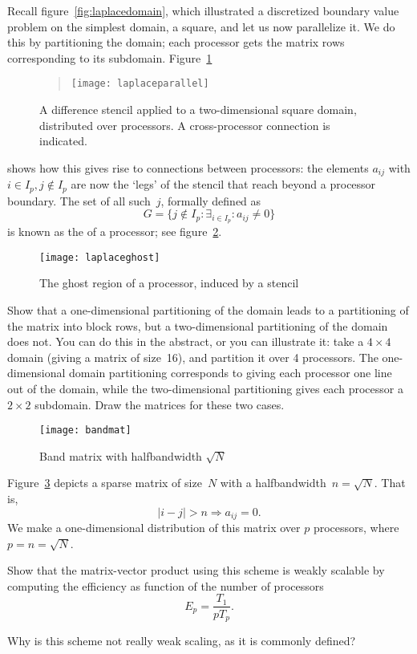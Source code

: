 Recall figure~\ref{fig:laplacedomain}, which illustrated a discretized
boundary value problem on the simplest domain, a square, and let us
now parallelize it. We do this by partitioning the domain; each
processor gets the matrix rows corresponding to its subdomain.
Figure~\ref{fig:laplaceparallel}
\begin{figure}
  \begin{quote}
    \texttt{[image: laplaceparallel]}
  \end{quote}
  \caption{A difference stencil applied to a two-dimensional square
    domain, distributed over processors. A cross-processor connection
    is indicated.}
  \label{fig:laplaceparallel}
\end{figure}
shows how this gives rise to connections between processors: the
elements $a_{ij}$ with $i\in I_p,j\not\in I_p$ are now the `legs' of
the stencil that reach beyond a processor boundary. The set of all
such~$j$, formally defined as 
\[ G = \{ j\not\in I_p \colon 
    \exists_{i\in I_p}\colon a_{ij}\not=0 \}
\]
is known as the  of a processor; see
figure~\ref{fig:ghost}.
\begin{figure}
  \texttt{[image: laplaceghost]}
  \caption{The ghost region of a processor, induced by a stencil}
  \label{fig:ghost}
\end{figure}

\begin{exercise}
  Show that a one-dimensional partitioning of the domain leads to a
  partitioning of the matrix into block rows, but a two-dimensional
  partitioning of the domain does not. You can do this in the
  abstract, or you can illustrate it: take a $4\times4$ domain (giving
  a matrix of size~16), and partition it over 4 processors. The
  one-dimensional domain partitioning corresponds to giving each
  processor one line out of the domain, while the two-dimensional
  partitioning gives each processor a $2\times2$ subdomain. Draw the
  matrices for these two cases.
\end{exercise}

\begin{figure}[ht]
  \texttt{[image: bandmat]}
  \caption{Band matrix with halfbandwidth $\sqrt N$}
  \label{fig:bandmat}
\end{figure}

\begin{exercise}
  \label{ex:bandmat-prod}
  Figure~\ref{fig:bandmat} depicts a sparse matrix of size~$N$ with a
  halfbandwidth~$n=\sqrt N$. That is,
  \[ |i-j|>n \Rightarrow a_{ij}=0. \]
  We make a one-dimensional distribution of this matrix over $p$
  processors, where $p=n=\sqrt N$.

  Show that the matrix-vector product using
  this scheme is weakly scalable by computing the efficiency
  as function of the number of processors
  \[ E_p = \frac{T_1}{pT_p}. \]

  Why is this scheme not really weak scaling, as it is commonly defined?
\end{exercise}

